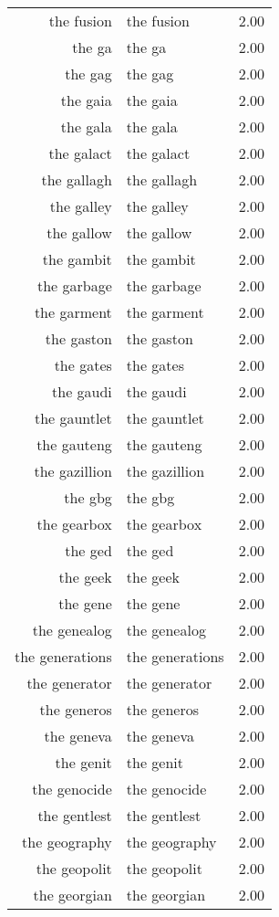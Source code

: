 \begin{table}[ht]
\begin{tabular}{rlr}
  the fusion & the fusion & 2.00 \\ 
  the ga & the ga & 2.00 \\ 
  the gag & the gag & 2.00 \\ 
  the gaia & the gaia & 2.00 \\ 
  the gala & the gala & 2.00 \\ 
  the galact & the galact & 2.00 \\ 
  the gallagh & the gallagh & 2.00 \\ 
  the galley & the galley & 2.00 \\ 
  the gallow & the gallow & 2.00 \\ 
  the gambit & the gambit & 2.00 \\ 
  the garbage & the garbage & 2.00 \\ 
  the garment & the garment & 2.00 \\ 
  the gaston & the gaston & 2.00 \\ 
  the gates & the gates & 2.00 \\ 
  the gaudi & the gaudi & 2.00 \\ 
  the gauntlet & the gauntlet & 2.00 \\ 
  the gauteng & the gauteng & 2.00 \\ 
  the gazillion & the gazillion & 2.00 \\ 
  the gbg & the gbg & 2.00 \\ 
  the gearbox & the gearbox & 2.00 \\ 
  the ged & the ged & 2.00 \\ 
  the geek & the geek & 2.00 \\ 
  the gene & the gene & 2.00 \\ 
  the genealog & the genealog & 2.00 \\ 
  the generations & the generations & 2.00 \\ 
  the generator & the generator & 2.00 \\ 
  the generos & the generos & 2.00 \\ 
  the geneva & the geneva & 2.00 \\ 
  the genit & the genit & 2.00 \\ 
  the genocide & the genocide & 2.00 \\ 
  the gentlest & the gentlest & 2.00 \\ 
  the geography & the geography & 2.00 \\ 
  the geopolit & the geopolit & 2.00 \\ 
  the georgian & the georgian & 2.00 \\ 

\end{tabular}
\end{table}

